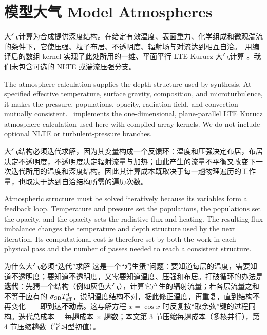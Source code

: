 \section{模型大气 Model Atmospheres}\label{sec:atmosphere}

大气计算为合成提供深度结构。在给定有效温度、表面重力、化学组成和微观湍流的条件下，它使压强、粒子布居、不透明度、辐射场与对流达到相互自洽。\paynezero\ 用编译后的数组 kernel 实现了此处所用的一维、平面平行 LTE Kurucz 大气计算 \citep{Kurucz2005}。我们未包含可选的 NLTE 或湍流压强分支。

\begin{EN}
The atmosphere calculation supplies the depth structure used by synthesis. At
specified effective temperature, surface gravity, composition, and
microturbulence, it makes the pressure, populations, opacity, radiation field,
and convection mutually consistent. \paynezero\ implements the
one-dimensional, plane-parallel LTE Kurucz atmosphere calculation used here
\citep{Kurucz2005} with compiled array kernels.
We do not include optional NLTE or
turbulent-pressure branches.
\end{EN}

大气结构必须迭代求解，因为其变量构成一个反馈环：温度和压强决定布居，布居决定不透明度，不透明度决定辐射流量与加热；由此产生的流量不平衡又改变下一次迭代所用的温度和深度结构。因此其计算成本既取决于每一趟物理遍历的工作量，也取决于达到自洽结构所需的遍历次数。

\begin{EN}
Atmospheric structure must be solved iteratively because its variables form a
feedback loop. Temperature and pressure set the populations, the populations
set the opacity, and the opacity sets the radiative flux and heating. The
resulting flux imbalance changes the temperature and depth structure used by
the next iteration. Its computational cost is therefore set by both the work
in each physical pass and the number of passes needed to reach a consistent
structure.
\end{EN}

\begin{physbox}{为什么大气必须“迭代”求解}
这是一个“鸡生蛋”问题：要知道每层的温度，需要知道不透明度；要知道不透明度，又需要知道温度、压强和布居。打破循环的办法是\textbf{迭代}：先猜一个结构（例如灰色大气），计算它产生的辐射流量；若各层流量之和不等于应有的 $\sigma_{\rm SB}T_{\rm eff}^4$，说明温度结构不对，据此修正温度，再重复，直到结构不再变化——即到达\textbf{不动点}。这与解方程 $x=\cos x$ 时反复按“取余弦”键的过程同构。迭代总成本 = 每趟成本 × 趟数；本文第 3 节压缩每趟成本（多核并行），第 4 节压缩趟数（学习型初值）。
\end{physbox}

